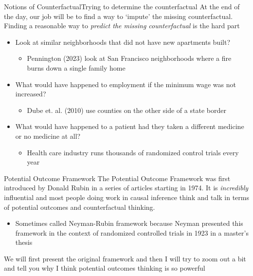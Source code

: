 \documentclass[aspectratio=169,t,11pt,table]{beamer}
\begin{document}
\begin{frame}{Notions of Counterfactual}{Trying to determine the counterfactual}
  At the end of the day, our job will be to find a way to `impute' the missing counterfactual. Finding a reasonable way to \emph{predict the missing counterfactual} is the hard part

  \bigskip
  \begin{itemize}
    \item Look at similar neighborhoods that did not have new apartments  built? 
    \begin{itemize}
      \item Pennington (2023) look at San Francisco neighborhoods where a fire burns down a single family home
    \end{itemize}
    
    \pause
    \item What would have happened to employment if the minimum wage was not increased? 

    \begin{itemize}
      \item Dube et. al. (2010) use counties on the other side of a state border
    \end{itemize}
    
    \pause
    \item What would have happened to a patient had they taken a different medicine or no medicine at all?
    \begin{itemize}
      \item Health care industry runs thousands of randomized control trials every year
    \end{itemize} 
  \end{itemize}
\end{frame}

\begin{frame}{Potential Outcome Framework}
  The \alert{Potential Outcome Framework} was first introduced by Donald Rubin in a series of articles starting in 1974. It is \emph{incredibly} influential and most people doing work in causal inference think and talk in terms of potential outcomes and counterfactual thinking.
  \begin{itemize}
    \item Sometimes called Neyman-Rubin framework because Neyman presented this framework in the context of randomized controlled trials in 1923 in a master's thesis
  \end{itemize}

  \pause
  \bigskip
  We will first present the original framework and then I will try to zoom out a bit and tell you why I think potential outcomes thinking is so powerful
\end{frame}
\end{document}
